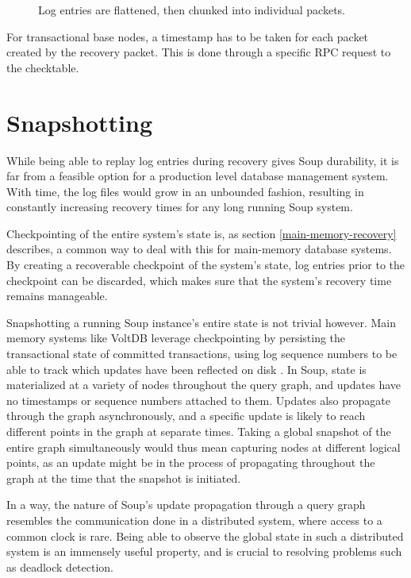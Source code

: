 \documentclass[b5paper]{report}
\begin{document}
\begin{figure}[H]
  
  \caption{
    Log entries are flattened, then chunked into individual packets.
    \label{log-chunking}
  }
\end{figure}

For transactional base nodes, a timestamp has to be taken for each packet
created by the recovery packet. This is done through a specific RPC request to the
checktable.

\section{Snapshotting}
While being able to replay log entries during recovery
gives Soup durability, it is far from a feasible option for a production level
database management system. With time, the log files would grow in an unbounded
fashion, resulting in constantly increasing recovery times for any long running
Soup system.

Checkpointing of the entire system's state is, as section
\ref{main-memory-recovery} describes, a common way to deal with this for
main-memory database systems. By creating a recoverable checkpoint of the
system's state, log entries prior to the checkpoint can be discarded, which
makes sure that the system's recovery time remains manageable.

Snapshotting a running Soup instance's entire state is not trivial however.
Main memory systems like VoltDB leverage checkpointing by persisting the
transactional state of committed transactions, using log sequence numbers to be
able to track which updates have been reflected on disk \cite{voltdb-recovery}.
In Soup, state is materialized at a variety of nodes throughout the query graph,
and updates have no timestamps or sequence numbers attached to them. Updates
also propagate through the graph asynchronously, and a specific update is likely
to reach different points in the graph at separate times. Taking a global
snapshot of the entire graph simultaneously would thus mean capturing nodes at
different logical points, as an update might be in the process of propagating
throughout the graph at the time that the snapshot is initiated.

In a way, the nature of Soup's update propagation through a query graph
resembles the communication done in a distributed system, where access to a
common clock is rare. Being able to observe the global state in such a
distributed system is an immensely useful property, and is crucial to resolving
problems such as deadlock detection.
\end{document}

